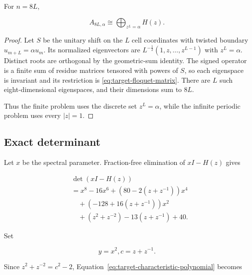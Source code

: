 \begin{proposition}
\label{prop:finite-floquet-decomposition}
For \(n=8L\),

\begin{equation}
\label{eq:target-finite-decomposition}
A_{8L,\alpha} \cong \bigoplus_{z^L=\alpha} H(z).
\end{equation}

\end{proposition}
\begin{proof}
Let \(S\) be the unitary shift on the \(L\) cell coordinates with
twisted boundary \(u_{m+L}=\alpha u_m\). Its normalized eigenvectors are
\(L^{-\frac{1}{2}}(1,z,\ldots,z^{L-1})\) with \(z^L=\alpha\). Distinct roots are orthogonal by
the geometric-sum identity. The signed operator is a finite sum of residue
matrices tensored with powers of \(S\), so each eigenspace is invariant and its
restriction is \eqref{eq:target-floquet-matrix}. There are \(L\) such eight-dimensional eigenspaces, and
their dimensions sum to \(8L\).

Thus the finite problem uses the discrete set \(z^L=\alpha\), while the infinite
periodic problem uses every \(\lvert z\rvert=1\).

\end{proof}
\subsection{Exact determinant}

Let \(x\) be the spectral parameter. Fraction-free elimination of
\(xI-H(z)\) gives

\begin{equation}
\label{eq:target-characteristic-polynomial}
\begin{aligned}
&\operatorname{det}(xI-H(z)) \\
&=x^{8}-16x^{6}+(80-2(z+z^{-1}))x^{4} \\
&\quad +(-128+16(z+z^{-1}))x^{2} \\
&\quad +(z^{2}+z^{-2})-13(z+z^{-1})+40.
\end{aligned}
\end{equation}

Set

\begin{equation}
y=x^{2},       c=z+z^{-1}.
\end{equation}

Since \(z^{2}+z^{-2}=c^{2}-2\), Equation~\eqref{eq:target-characteristic-polynomial} becomes

